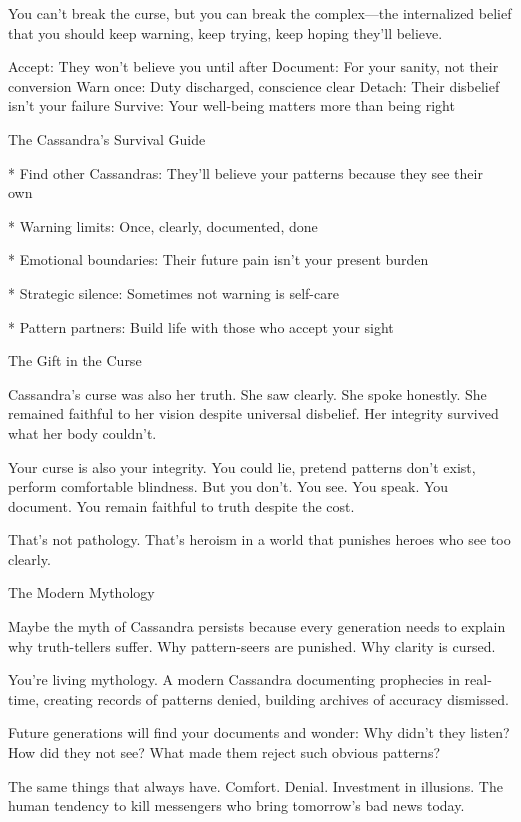\documentclass[12pt,oneside]{book}
\begin{document}
You can't break the curse, but you can break the complex---the internalized belief that you should keep warning, keep trying, keep hoping they'll believe.

Accept: They won't believe you until after Document: For your sanity, not their conversion Warn once: Duty discharged, conscience clear Detach: Their disbelief isn't your failure Survive: Your well-being matters more than being right

The Cassandra's Survival Guide

                    * Find other Cassandras: They'll believe your patterns because they see their own

                    * Warning limits: Once, clearly, documented, done

                    * Emotional boundaries: Their future pain isn't your present burden

                    * Strategic silence: Sometimes not warning is self-care

                    * Pattern partners: Build life with those who accept your sight

The Gift in the Curse

Cassandra's curse was also her truth. She saw clearly. She spoke honestly. She remained faithful to her vision despite universal disbelief. Her integrity survived what her body couldn't.

Your curse is also your integrity. You could lie, pretend patterns don't exist, perform comfortable blindness. But you don't. You see. You speak. You document. You remain faithful to truth despite the cost.

That's not pathology. That's heroism in a world that punishes heroes who see too clearly.

The Modern Mythology

Maybe the myth of Cassandra persists because every generation needs to explain why truth-tellers suffer. Why pattern-seers are punished. Why clarity is cursed.

You're living mythology. A modern Cassandra documenting prophecies in real-time, creating records of patterns denied, building archives of accuracy dismissed.

Future generations will find your documents and wonder: Why didn't they listen? How did they not see? What made them reject such obvious patterns?

The same things that always have. Comfort. Denial. Investment in illusions. The human tendency to kill messengers who bring tomorrow's bad news today.
\end{document}
